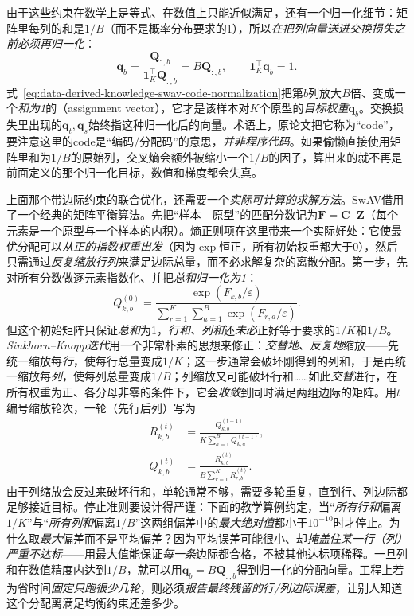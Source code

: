 由于这些约束在数学上是等式、在数值上只能近似满足，还有一个归一化细节：矩阵里每列的和是$1/B$（而不是概率分布要求的1），所以\emph{在把列向量送进交换损失之前必须再归一化}：
\begin{equation}
  \bm{q}_b
  =
  \frac{\bm{Q}_{:,b}}
       {\bm{1}_K^{\top}\bm{Q}_{:,b}}
  =
  B\bm{Q}_{:,b},
  \qquad
  \bm{1}_K^{\top}\bm{q}_b=1.
  \label{eq:data-derived-knowledge-swav-code-normalization}
\end{equation}
式~\eqref{eq:data-derived-knowledge-swav-code-normalization}把第$b$列放大$B$倍、变成一个\emph{和为1}的（assignment vector），它才是该样本对$K$个原型的\emph{目标权重}$\bm{q}_b$。交换损失里出现的$\bm{q}_t,\bm{q}_s$始终指这种归一化后的向量。术语上，原论文把它称为“code”，要注意这里的code是“编码/分配码”的意思，\emph{并非程序代码}。如果偷懒直接使用矩阵里和为$1/B$的原始列，交叉熵会额外被缩小一个$1/B$的因子，算出来的就不再是前面定义的那个归一化目标，数值和梯度都会失真。

上面那个带边际约束的联合优化，还需要一个\emph{实际可计算的求解方法}。SwAV借用了一个经典的矩阵平衡算法。先把“样本—原型”的匹配分数记为$\bm{F}=\bm{C}^{\top}\bm{Z}$（每个元素是一个原型与一个样本的内积）。熵正则项在这里带来一个实际好处：它使最优分配可以\emph{从正的指数权重出发}（因为$\exp$恒正，所有初始权重都大于0），然后只需通过\emph{反复缩放行列}来满足边际总量，而不必求解复杂的离散分配。第一步，先对所有分数做逐元素指数化、并把\emph{总和归一化为1}：
\[
  Q_{k,b}^{(0)}
  =\frac{\exp(F_{k,b}/\varepsilon)}
  {\sum_{r=1}^{K}\sum_{a=1}^{B}\exp(F_{r,a}/\varepsilon)}.
\]
但这个初始矩阵只保证\emph{总和}为1，\emph{行和、列和}还\emph{未必}正好等于要求的$1/K$和$1/B$。\emph{Sinkhorn--Knopp迭代}用一个非常朴素的思想来修正：\emph{交替地、反复地}缩放——先统一缩放每\emph{行}，使每行总量变成$1/K$；这一步通常会破坏刚得到的列和，于是再统一缩放每\emph{列}，使每列总量变成$1/B$；列缩放又可能破坏行和……如此\emph{交替}进行，在所有权重为正、各分母非零的条件下，它会\emph{收敛}到同时满足两组边际的矩阵。用$t$编号缩放轮次，一轮（先行后列）写为
\begin{equation}
  \begin{aligned}
    R_{k,b}^{(t)}
    &=\frac{Q_{k,b}^{(t-1)}}{K\sum_{a=1}^{B}Q_{k,a}^{(t-1)}},\\
    Q_{k,b}^{(t)}
    &=\frac{R_{k,b}^{(t)}}{B\sum_{r=1}^{K}R_{r,b}^{(t)}}.
  \end{aligned}
  \label{eq:data-derived-knowledge-sinkhorn-scaling}
\end{equation}
由于列缩放会反过来破坏行和，单轮通常不够，需要多轮重复，直到行、列边际都足够接近目标。停止准则要设计得严谨：下面的教学算例约定，当“\emph{所有行和}偏离$1/K$”与“\emph{所有列和}偏离$1/B$”这两组偏差中的\emph{最大绝对值}都小于$10^{-10}$时才停止。为什么取\emph{最大}偏差而不是平均偏差？因为平均误差可能很小、却\emph{掩盖住某一行（列）严重不达标}——用最大值能保证\emph{每一条}边际都合格，不被其他达标项稀释。一旦列和在数值精度内达到$1/B$，就可以用$\bm{q}_b=B\bm{Q}_{:,b}$得到归一化的分配向量。工程上若为省时间\emph{固定只跑很少几轮}，则必须\emph{报告最终残留的行/列边际误差}，让别人知道这个分配离满足均衡约束还差多少。

